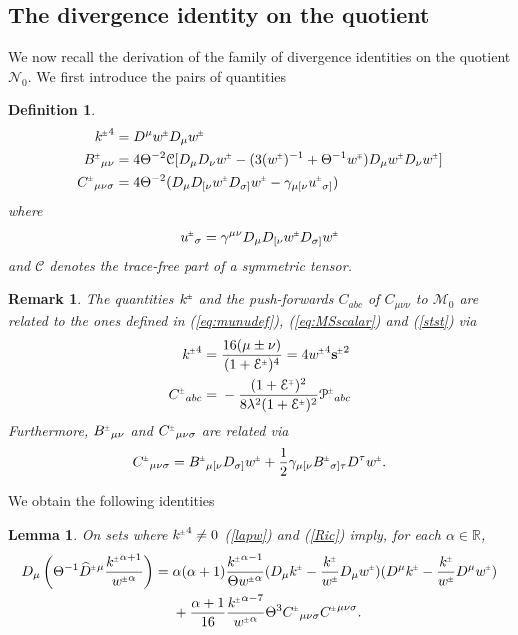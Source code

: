 \documentclass[a4paper,10pt,reqno]{amsart}
\newcommand{\cE}{\mathcal{E}}
\newcommand{\cM}{\mathcal{M}}
\newcommand{\cN}{\mathcal{N}}
\newcommand{\wh}{\widehat}
\newcommand{\Th}{\Theta}
\newcommand{\al}{\alpha}
\newcommand{\si}{\sigma}
\theoremstyle{plain}
\newtheorem{lemma}[thm]{Lemma}
\newtheorem{definition}[thm]{Definition}
\newtheorem{remark}[thm]{Remark}
\newcommand{\PM}[1]{{{#1}^{\hspace{-.5pt}\scaleto{\pm}{3.5pt}}}}
\newcommand{\MP}[1]{{{#1}^{\hspace{-.5pt}\scaleto{\mp}{3.5pt}}}}
\def\sbold{\mathbf{s}}
\numberwithin{equation}{section}
\begin{document}
\subsection{The divergence identity on the quotient}
We now recall the derivation of the family of  divergence identities on the quotient $\cN_0$.  
\label{sec:divid}
 We first introduce  the pairs of quantities
\begin{definition}
\begin{align} \label{k}  
\PM{k}^{4} ={}& D^{\mu} \PM{w} D_{\mu}\PM{w} \\
\label{b}
 \PM{B}_{\mu\nu} ={}& 4\Theta^{-2}\mathcal{C}[D_{\mu}D_{\nu}\PM{w} - (3(\PM{w})^{-1} +
  \Theta^{-1} \MP{w})D_{\mu}\PM{w} D_{\nu}\PM{w}] \\
\label{c}
\PM{C}_{\mu\nu\si} ={}& 4\Theta^{-2}(D_{\mu}D_{[\nu}\PM{w}D_{\sigma]}\PM{w} -
  \gamma_{\mu[\nu} \PM{u}_{\sigma]})
\end{align}
where 
\begin{equation} \label{u}
\PM{u}_{\si} = \gamma^{\mu\nu} D_{\mu} D_{[\nu} \PM{w} D_{\si]} \PM{w}
\end{equation}
and  $\mathcal{ C}$ denotes the trace-free part of a symmetric tensor.
\end{definition}
\begin{remark}
The quantities $\PM{k}$ and the push-forwards $C_{abc}$ of $C_{\mu\nu\nu}$ to ${\cM}_0$ are related to the ones defined in  (\ref{eq:munudef}), (\ref{eq:MSscalar}) and (\ref{stst}) 
via
\begin{align}
\PM{k}^4  ={}& \frac{16 (\mu \pm \nu)}{(1 + \PM{\cE})^4} = 4 \PM{w}^4 \PM{\sbold}^2 \\
\PM{C}_{abc}  ={}& -  \frac{(1 + \MP{\cE})^2}{8 \lambda^2 (1 + \PM{\cE})^2} \PM{\mathcal{P}}_{abc}
\end{align}
Furthermore, $\PM{B}_{\mu\nu}$ and $\PM{C}_{\mu\nu\si}$ are related via 
\begin{align}
\PM{C}_{\mu\nu\si} = \PM{B}_{\mu[\nu} D_{\si]}\PM{w} + \frac{1}{2} \gamma_{\mu[\nu} \PM{B}_{\si]\tau} D^{\tau} \PM{w}.
\end{align}
\end{remark}
%
%
We obtain  the following identities  \cite{simon:1995}

\begin{lemma}
\label{lem:divid}
On sets where $\PM{k}^{4} \ne 0$ (\ref{lapw}) and (\ref{Ric}) imply,
for each $\al \in \mathbb{R}$,
\begin{align}
\label{ddkw}
D_{\mu}\left(\Th^{-1}  \PM{\wh D}{}^{\mu} \frac{\PM{k}^{\al + 1}}{\PM{w}^\al} \right)
={}& \al (\al + 1) \frac{\PM{k}^{\al - 1}}
{\Theta \PM{w}^{\al}}
(D_{\mu} \PM{k} - \frac{\PM{k}}{\PM{w}}D_{\mu}\PM{w})
(D^{\mu} \PM{k} - \frac{\PM{k}}{\PM{w}}D^{\mu}\PM{w})
\nonumber \\
& +\frac{\al + 1}{16} \frac{\PM{k}^{\al - 7}}{\PM{w}^{\al}}
\Theta^{3} \PM{C}_{\mu\nu\si} \PM{C}^{\mu\nu\si}.
\end{align}
\end{lemma}
\end{document}
